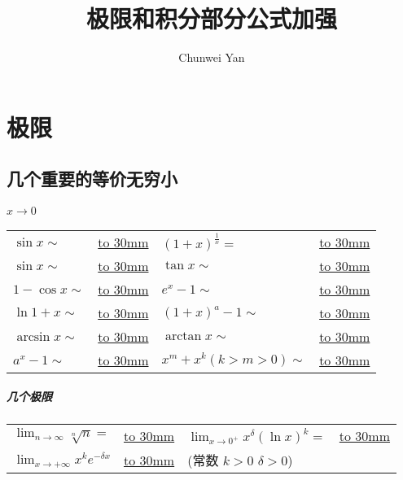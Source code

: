 \documentclass[a4paper]{ctexart}
\author{Chunwei Yan}
\title{极限和积分部分公式加强}
\begin{document}
    \maketitle

\section{极限}

\subsection{几个重要的等价无穷小}
\paragraph{$x \rightarrow 0$}

\begin{center}
\renewcommand\arraystretch{1.5}
    \begin{tabular}{  l  l  l  l }
        $\sin{x}\sim$ & 
        \underline{\hbox to 30mm{}} &
        $(1+x)^\frac{1}{x}=$ &
        \underline{\hbox to 30mm{}} \\
        $\sin{x} \sim$  &
        \underline{\hbox to 30mm{}} &
        $\tan{x} \sim$   &
        \underline{\hbox to 30mm{}} \\
        $1 - \cos{x} \sim $         &
        \underline{\hbox to 30mm{}} &
        $e^x - 1 \sim$              &
        \underline{\hbox to 30mm{}} \\
        $\ln{1+x} \sim$             &
        \underline{\hbox to 30mm{}} &
        $(1+x)^a - 1 \sim$          &
        \underline{\hbox to 30mm{}} \\
        $\arcsin{x} \sim$           &
        \underline{\hbox to 30mm{}} &
        $\arctan{x} \sim$           &
        \underline{\hbox to 30mm{}} \\
        $a^x - 1 \sim$              &
        \underline{\hbox to 30mm{}} &
        $x^m + x^k(k>m>0) \sim$       &
        \underline{\hbox to 30mm{}} \\
    \end{tabular}
\end{center}

\subparagraph{几个极限}
\begin{center}
\renewcommand\arraystretch{1.5}
    \begin{tabular}{  l  l  l  l }
    $\lim_{n \rightarrow \infty} { \sqrt[n]{n}} =$   &
        \underline{\hbox to 30mm{}}                  &
    $\lim_{x \rightarrow 0^+}
          { x^\delta(\ln{x})^k }
        =$                                           &
        \underline{\hbox to 30mm{}} \\
    $\lim_{x \rightarrow +\infty}
        {
            x^k e^{-\delta x}
        }$                                           &
        \underline{\hbox to 30mm{}}                  & 
        (常数 $k>0$ \quad $\delta >0$)               &
        \\
    \end{tabular}
\end{center}
\end{document}
